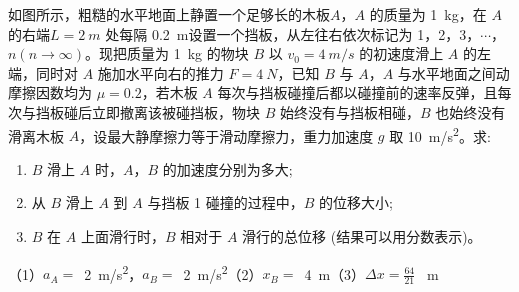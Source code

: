 如图所示，粗糙的水平地面上静置一个足够长的木板\( A \)，\( A \) 的质量为 \SI{1}{kg}，在 \( A \) 的右端\( L = \SI{2}{m} \) 处每隔 \SI{0.2}{m}设置一个挡板，从左往右依次标记为 1，2，3，\(\cdots\)， \( n(n \to \infty) \)。现把质量为 \SI{1}{kg} 的物块 \( B \) 以 \( v_0 = \SI{4}{m/s} \) 的初速度滑上 \( A \) 的左端，同时对 \( A \) 施加水平向右的推力 \( F = \SI{4}{N} \)，已知 \( B \) 与 \( A \)，\( A \) 与水平地面之间动摩擦因数均为 \( \mu = 0.2 \)，若木板 \( A \) 每次与挡板碰撞后都以碰撞前的速率反弹，且每次与挡板碰后立即撤离该被碰挡板，物块 \( B \) 始终没有与挡板相碰，\( B \) 也始终没有滑离木板 \( A \)，设最大静摩擦力等于滑动摩擦力，重力加速度 \( g \) 取 \SI{10}{m/s^2}。求:
\begin{enumerate}
	\item \( B \) 滑上 \( A \) 时，\( A \)，\( B \) 的加速度分别为多大;
	\item 从 \( B \) 滑上 \( A \) 到 \( A \) 与挡板 1 碰撞的过程中，\( B \) 的位移大小;
	\item \( B \) 在 \( A \) 上面滑行时，\( B \) 相对于 \( A \) 滑行的总位移 (结果可以用分数表示)。
\end{enumerate}

\begin{answer}
	（1）\(a_A =\) \,\qty{2}{m/s^2}，\(a_B =\) \,\qty{2}{m/s^2}（2）\(x_B =\) \,\qty{4}{m}（3）\(\Delta x = \frac{64}{21}\) \qty{}{m}
\end{answer}